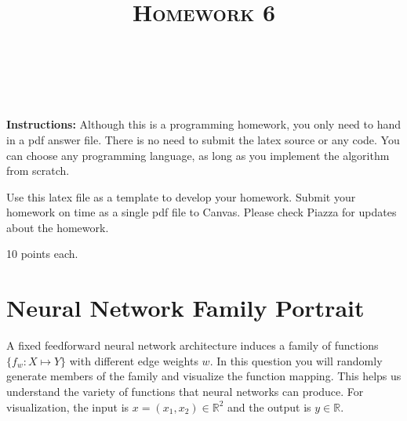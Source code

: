 \documentclass[a4paper]{article}
\title{\textsc{Homework 6}} %
\author{
\red{$AKASH SHARMA$} \\
\red{$9081731771$}\\
}
\date{}
\theoremstyle{definition}
\def\R{\mathbb R}
\begin{document}
\maketitle 


\textbf{Instructions:} 
Although this is a programming homework, you only need to hand in a pdf answer file.
There is no need to submit the latex source or any code.
You can choose any programming language, as long as you implement the algorithm from scratch. 

Use this latex file as a template to develop your homework.
Submit your homework on time as a single pdf file to Canvas.
Please check Piazza for updates about the homework.

10 points each.

\section{Neural Network Family Portrait}
A fixed feedforward neural network architecture induces a family of functions $\{f_w: X \mapsto Y\}$ with different edge weights $w$.
In this question you will randomly generate members of the family and visualize the function mapping. 
This helps us understand the variety of functions that neural networks can produce. 
For visualization, the input is $x=(x_1, x_2) \in \R^2$ and the output is $y\in\R$.
\end{document}
